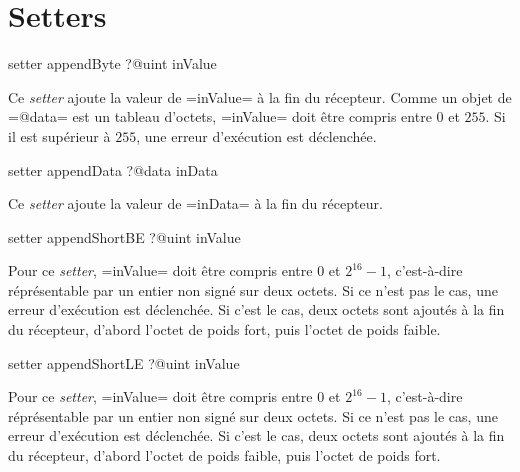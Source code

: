 \section{Setters}



\begin{galgas3}
setter appendByte ?@uint inValue
\end{galgas3}

Ce \emph{setter} ajoute la valeur de \ggst=inValue= à la fin du récepteur. Comme un objet de \ggst=@data= est un tableau d'octets, \ggst=inValue= doit être compris entre $0$ et $255$. Si il est supérieur à $255$, une erreur d'exécution est déclenchée.




\begin{galgas3}
setter appendData ?@data inData
\end{galgas3}

Ce \emph{setter} ajoute la valeur de \ggst=inData= à la fin du récepteur.






\begin{galgas3}
setter appendShortBE ?@uint inValue
\end{galgas3}

Pour ce \emph{setter}, \ggst=inValue= doit être compris entre $0$ et $2^{16}-1$, c'est-à-dire réprésentable par un entier non signé sur deux octets. Si ce n'est pas le cas, une erreur d'exécution est déclenchée. Si c'est le cas, deux octets sont ajoutés à la fin du récepteur, d'abord l'octet de poids fort, puis l'octet de poids faible.








\begin{galgas3}
setter appendShortLE ?@uint inValue
\end{galgas3}

Pour ce \emph{setter}, \ggst=inValue= doit être compris entre $0$ et $2^{16}-1$, c'est-à-dire réprésentable par un entier non signé sur deux octets. Si ce n'est pas le cas, une erreur d'exécution est déclenchée. Si c'est le cas, deux octets sont ajoutés à la fin du récepteur, d'abord l'octet de poids faible, puis l'octet de poids fort.








